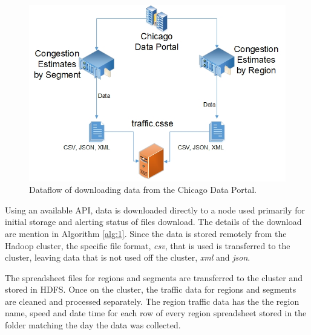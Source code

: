 \documentclass[titlepage,twocolumn]{article}
\begin{document}
\begin{figure}[h]
	\centering
	\includegraphics[scale=.4]{DataStorageDrawing.jpg}
	\caption{\small Dataflow of downloading data from the Chicago Data Portal.}
	\label{fig:DataDownload}
\end{figure}

\par Using an available API, data is downloaded directly to a node used primarily for initial storage and alerting status of files download. The details of the download are mention in Algorithm \ref{alg:1}. Since the data is stored remotely from the Hadoop cluster, the specific file format, \textit{csv}, that is used is transferred to the cluster, leaving data that is not used off the cluster, \textit{xml} and \textit{json}. 

\par The spreadsheet files for regions and segments are transferred to the cluster and stored in HDFS. Once on the cluster, the traffic data for regions and segments are cleaned and processed separately. The region traffic data has the the region name, speed and date time for each row of every region spreadsheet stored in the folder matching the day the data was collected. 
\end{document}
